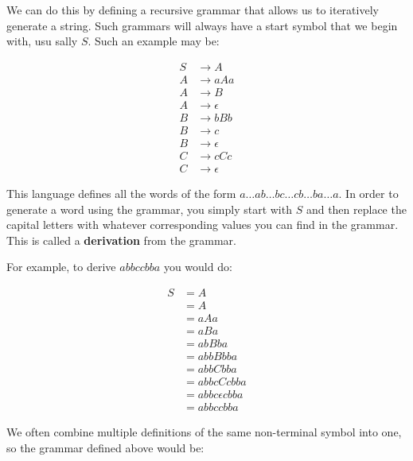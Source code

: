 We can do this by defining a recursive grammar that allows us to iteratively
generate a string. Such grammars will always have a start symbol that we begin
with, usu sally $S$. Such an example may be:

\[
	\begin{split}
		S &\rightarrow A\\
		A &\rightarrow aAa\\
		A &\rightarrow B\\
		A &\rightarrow \epsilon\\
		B &\rightarrow bBb\\
		B &\rightarrow c\\
		B &\rightarrow \epsilon\\
		C &\rightarrow cCc\\
		C &\rightarrow \epsilon
	\end{split}
\]

This language defines all the words of the form $a \dots ab \dots bc \dots cb
\dots ba \dots a$. In order to generate a word using the grammar, you simply
start with $S$ and then replace the capital letters with whatever corresponding
values you can find in the grammar. This is called a {\bf derivation} from the
grammar.


For example, to derive $abbccbba$ you would do:

\[
	\begin{split}
		S &= A\\
		  &= A\\
		  &= aAa\\
		  &= aBa\\
		  &= abBba\\
		  &= abbBbba\\
		  &= abbCbba\\
		  &= abbcCcbba\\
		  &= abbc \epsilon cbba\\
		  &= abbccbba
	\end{split}	
\]

We often combine multiple definitions of the same non-terminal symbol into one,
so the grammar defined above would be:

